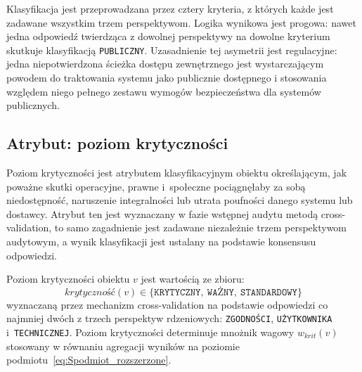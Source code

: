 Klasyfikacja jest przeprowadzana przez cztery kryteria, z których każde jest zadawane wszystkim trzem perspektywom.
Logika wynikowa jest progowa: nawet jedna odpowiedź twierdząca z dowolnej perspektywy na dowolne kryterium
skutkuje klasyfikacją \texttt{PUBLICZNY}. Uzasadnienie tej asymetrii jest regulacyjne: jedna niepotwierdzona
ścieżka dostępu zewnętrznego jest wystarczającym powodem do traktowania systemu jako publicznie dostępnego
i stosowania względem niego pełnego zestawu wymogów bezpieczeństwa dla systemów publicznych.

\subsection{Atrybut: poziom krytyczności}

Poziom krytyczności jest atrybutem klasyfikacyjnym obiektu 
określającym, jak poważne skutki operacyjne, prawne i~społeczne 
pociągnęłaby za sobą niedostępność, naruszenie integralności 
lub utrata poufności danego systemu lub dostawcy. Atrybut ten 
jest wyznaczany w fazie wstępnej audytu metodą cross-validation, to samo zagadnienie jest zadawane niezależnie trzem perspektywom audytowym, a wynik klasyfikacji jest ustalany na podstawie 
konsensusu odpowiedzi.

\begin{definition}
Poziom krytyczności obiektu $v$ jest wartością ze zbioru:
\[
\textit{krytyczność}(v) \in 
\{\texttt{KRYTYCZNY},\ \texttt{WAŻNY},\ \texttt{STANDARDOWY}\}
\]
wyznaczaną przez mechanizm cross-validation na podstawie 
odpowiedzi co najmniej dwóch z trzech perspektyw rdzeniowych: 
\texttt{ZGODNOŚCI}, \texttt{UŻYTKOWNIKA} i~\texttt{TECHNICZNEJ}. 
Poziom krytyczności determinuje mnożnik wagowy $w_{krit}(v)$ 
stosowany w równaniu agregacji wyników na poziomie 
podmiotu~\eqref{eq:Spodmiot_rozszerzone}.
\end{definition}

